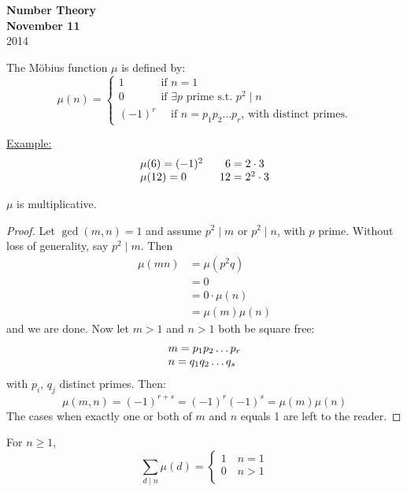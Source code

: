 \documentclass{report}
\begin{document}
{\centering
\Large
\textbf{Number Theory}\\
\normalsize
\textbf{November 11}\\
2014\\
}
\vspace{5mm}
\begin{defi} The M\"{o}bius function $\mu$ is defined by:
	\[ \mu(n)= 	\left \{
						\begin{array}{lcl}
							1 \quad \qquad\text{ if } n=1\\
							0 \quad \qquad \text{ if } \exists p \text{ prime s.t. } p^2 \mid n\\
							(-1)^r \quad \text{ if }n=p_1p_2 \dots p_r \text{,  with distinct primes.}
						\end{array}
						\right.
	\]
\end{defi}
\underline{Example:}\\
\[ \begin{array}{l c l}
			\mu(6)=(-1)^2 \qquad 6=2\cdot 3\\
			\mu(12)=0 \quad \qquad 12=2^2\cdot 3\\
		\end{array}
\]
\begin{thm}
		$\mu$ is multiplicative.
\end{thm}
\begin{proof}
				Let $\gcd(m,n)=1$ and assume $p^2 \mid m$ or $p^2\mid n$, with $p$ prime. Without loss of generality, say $p^2 \mid m$. Then \begin{equation*}
				\begin{aligned}
				\mu(mn) &=\mu(p^2q)\\
				&=0\\
				&=0\cdot \mu(n)\\
				&=\mu(m)\mu(n)
				\end{aligned}
				\end{equation*}
				and we are done.
				Now let $m>1$ and $n>1$ both be square free:
					\[\begin{array}{l c l}
						m=p_1p_2 \dots p_r\\
						n=q_1q_2 \dots q_s
						\end{array}
					\]
					with $p_i$, $q_j$ distinct primes.
				Then:
					\[
						\mu(m,n)=(-1)^{r+s}=(-1)^r(-1)^s=\mu(m) \mu(n)
					\]
				The cases when exactly one or both of $m$ and $n$ equals 1 are left to the reader.
\end{proof}
\begin{thm}
			For $n\geq1$,
				\[ \sum_{d \mid n} \mu(d) = \left \{
																		\begin{array}{lcl}
																			1 \quad n=1\\
																			0 \quad n>1\\
																		\end{array}
																		\right.
				\]
\end{thm}
\end{document}
